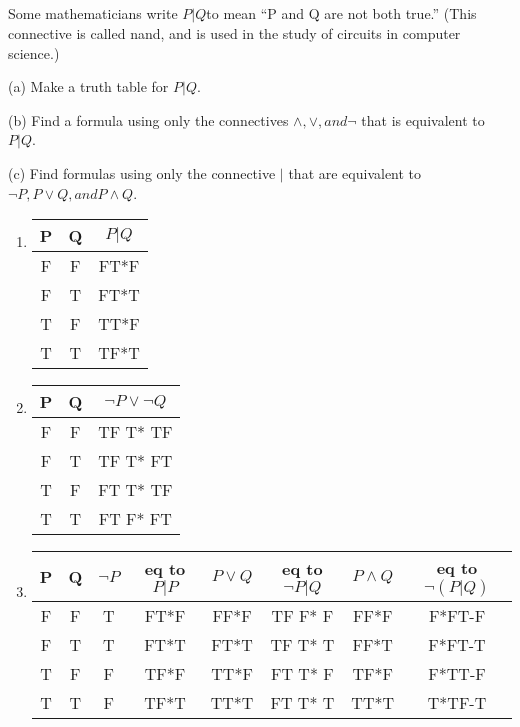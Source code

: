 \documentclass{article}
\begin{document}
\subsection{}
Some mathematicians write $P | Q$to mean “P and Q are not both
true.” (This connective is called nand, and is used in the study of
circuits in computer science.)

(a) Make a truth table for $P | Q$.

(b) Find a formula using only the connectives $\land, \lor, and \neg$ that is
equivalent to $P | Q$.

(c) Find formulas using only the connective $|$ that are equivalent to $\neg P, P
\lor Q, and P \land Q$.
\begin{enumerate}[label=(\alph*)]
  \item 
\begin{center}
 \begin{tabular}{||c c c ||} 
 \hline
 P & Q & $P \vert Q$ \\ [0.5ex] 
 \hline\hline
 F & F & FT*F\\ 
 \hline
 F & T & FT*T\\
 \hline
 T & F & TT*F\\
 \hline
 T & T & TF*T\\ [1ex] 
 \hline
\end{tabular}
\end{center}
\item
\begin{center}
 \begin{tabular}{||c c c ||} 
 \hline
 P & Q & $\neg P \lor \neg Q$ \\ [0.5ex] 
 \hline\hline
 F & F & TF T* TF\\ 
 \hline
 F & T & TF T* FT\\
 \hline
 T & F & FT T* TF\\
 \hline
 T & T & FT F* FT\\ [1ex] 
 \hline
\end{tabular}
\end{center}
\item
\begin{center}
 \begin{tabular}{||c c c c c c c c||} 
 \hline
 P & Q & $\neg P$ &eq to $P \vert P$ & $P \lor Q$ & eq to $\neg P \vert Q$ & $P \land Q$ & eq to $\neg (P \vert Q)$ \\ [0.2ex] 
 \hline\hline
 F & F & T & FT*F & FF*F & TF F* F & FF*F & F*FT-F\\ 
 \hline
 F & T & T & FT*T & FT*T & TF T* T & FF*T & F*FT-T\\
 \hline
 T & F & F & TF*F & TT*F & FT T* F & TF*F & F*TT-F\\
 \hline
 T & T & F & TF*T & TT*T & FT T* T & TT*T & T*TF-T\\ [1ex] 
 \hline
\end{tabular}
\end{center}
\end{enumerate}
\end{document}
